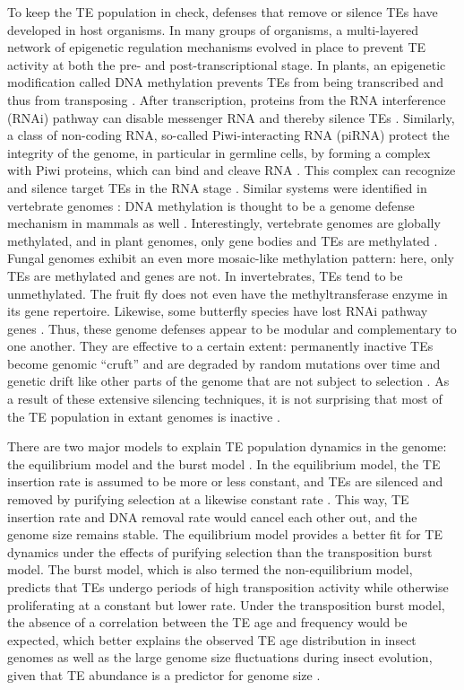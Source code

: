 To keep the TE population in check, defenses that remove or silence TEs
have developed in host organisms.  In many groups of organisms, a
multi-layered network of epigenetic regulation mechanisms evolved in
place to prevent TE activity at both the pre- and post-transcriptional
stage.  In plants, an epigenetic modification called DNA methylation
prevents TEs from being transcribed and thus from transposing
\citep{Slotkin2007, Lisch2009}.  After transcription, proteins from the
RNA interference (RNAi) pathway can disable messenger RNA and thereby
silence TEs \citep{Buchon2006}.  Similarly, a class of non-coding RNA,
so-called Piwi-interacting RNA (piRNA) protect the integrity of the
genome, in particular in germline cells, by forming a complex with Piwi
proteins, which can bind and cleave RNA \citep{Zeng2011}.  This complex
can recognize and silence target TEs in the RNA stage \citep{Siomi2011,
Mondal2018}.  Similar systems were identified in vertebrate genomes
\citep{Suzuki2008, Schubeler2015}: DNA methylation is thought to be a
genome defense mechanism in mammals as well \citep{Yoder1997}.
Interestingly, vertebrate genomes are globally methylated, and in plant
genomes, only gene bodies and TEs are methylated \citep{Suzuki2008}.
Fungal genomes exhibit an even more mosaic-like methylation pattern:
here, only TEs are methylated and genes are not.  In invertebrates, TEs
tend to be unmethylated.  The fruit fly 
does not even have the methyltransferase enzyme in its gene repertoire.
Likewise, some butterfly species have lost RNAi pathway genes
\citep{Pauli2016}.  Thus, these genome defenses appear to be modular and
complementary to one another.  They are effective to a certain extent:
permanently inactive TEs become genomic ``cruft'' and are degraded by
random mutations over time and genetic drift like other parts of the
genome that are not subject to selection \citep{Szitenberg2016}.  As a
result of these extensive silencing techniques, it is not surprising
that most of the TE population in extant genomes is inactive
\citep{Yoder1997, Zilberman2007}.

There are two major models to explain TE population dynamics in the
genome: the equilibrium model and the burst model \citep{Petrov2011,
Kofler2012, Cridland2013, Blumenstiel2014}.  In the equilibrium model,
the TE insertion rate is assumed to be more or less constant, and TEs
are silenced and removed by purifying selection at a likewise constant
rate \citep{Charlesworth1983}.  This way, TE insertion rate and DNA
removal rate would cancel each other out, and the genome size remains
stable.  The equilibrium model provides a better fit for TE dynamics
under the effects of purifying selection \citep{Barron2014} than the
transposition burst model.  The burst model, which is also termed the
non-equilibrium model, predicts that TEs undergo periods of high
transposition activity while otherwise proliferating at a constant but
lower rate.  Under the transposition burst model, the absence of a
correlation between the TE age and frequency would be expected, which
better explains the observed TE age distribution in insect genomes as
well as the large genome size fluctuations during insect evolution,
given that TE abundance is a predictor for genome size
\citep{Alfsnes2017, Petersen2018a}.

